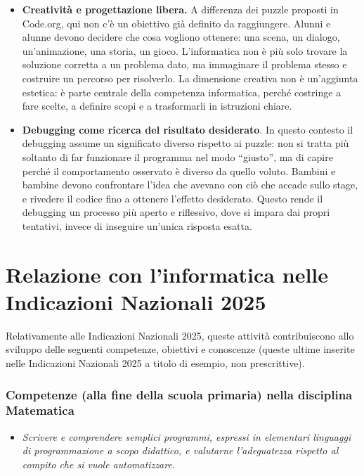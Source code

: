 \begin{itemize}
\item
  \textbf{Creatività e progettazione libera.} A differenza dei puzzle proposti in Code.org, qui non c'è un obiettivo già definito da raggiungere. Alunni e alunne devono decidere che cosa vogliono ottenere: una scena, un dialogo, un'animazione, una storia, un gioco. L'informatica non è più solo trovare la soluzione corretta a un problema dato, ma immaginare il problema stesso e costruire un percorso per risolverlo. La dimensione creativa non è un'aggiunta estetica: è parte centrale della competenza informatica, perché costringe a fare scelte, a definire scopi e a trasformarli in istruzioni chiare.
\item
  \textbf{Debugging come ricerca del risultato desiderato}. In questo contesto il debugging assume un significato diverso rispetto ai puzzle: non si tratta più soltanto di far funzionare il programma nel modo ``giusto'', ma di capire perché il comportamento osservato è diverso da quello voluto. Bambini e bambine devono confrontare l'idea che avevano con ciò che accade sullo stage, e rivedere il codice fino a ottenere l'effetto desiderato. Questo rende il debugging un processo più aperto e riflessivo, dove si impara dai propri tentativi, invece di inseguire un'unica risposta esatta.
\end{itemize}

\section{Relazione con l'informatica nelle Indicazioni Nazionali 2025 }\label{relazione-con-linformatica-nelle-indicazioni-nazionali-5}

Relativamente alle Indicazioni Nazionali 2025, queste attività contribuiscono allo sviluppo delle seguenti competenze, obiettivi e conoscenze (queste ultime inserite nelle Indicazioni Nazionali 2025 a titolo di esempio, non prescrittive).


\subsubsection{Competenze (alla fine della scuola primaria) nella disciplina Matematica}


\begin{itemize}
\item
  \emph{Scrivere e comprendere semplici programmi, espressi in elementari linguaggi di programmazione a scopo didattico, e valutarne l'adeguatezza rispetto al compito che si vuole automatizzare.}
\end{itemize}


